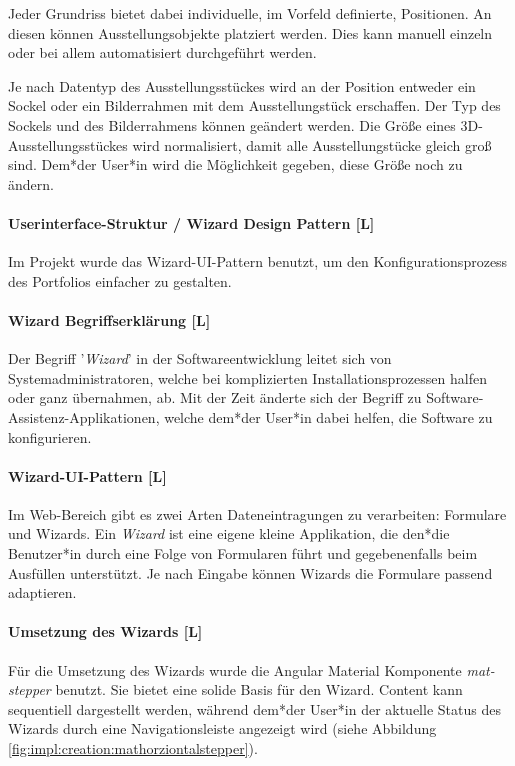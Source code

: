 Jeder Grundriss bietet dabei individuelle, im Vorfeld definierte, Positionen. An diesen können Ausstellungsobjekte
platziert werden. Dies kann manuell einzeln oder bei allem automatisiert durchgeführt werden.

Je nach Datentyp des Ausstellungsstückes wird an der Position entweder ein Sockel oder ein Bilderrahmen mit dem Ausstellungstück erschaffen. Der Typ des Sockels und des Bilderrahmens können geändert werden.
Die Größe eines 3D-Ausstellungsstückes wird normalisiert, damit alle Ausstellungstücke gleich groß sind. Dem*der User*in wird die Möglichkeit gegeben, diese Größe noch zu ändern.

\paragraph{Userinterface-Struktur / Wizard Design Pattern [L]}
\label{sec::contentcreation::wizard}
Im Projekt wurde das Wizard-UI-Pattern benutzt, um den Konfigurationsprozess des Portfolios einfacher zu gestalten.

\paragraph*{Wizard Begriffserklärung [L]}
Der Begriff '\emph{Wizard}' in der Softwareentwicklung leitet sich von Systemadministratoren, welche bei komplizierten Installationsprozessen halfen oder ganz übernahmen, ab. Mit der Zeit änderte sich der Begriff zu Software-Assistenz-Applikationen, welche dem*der User*in dabei helfen, die Software zu konfigurieren. \cite[Ursprung des Begriffs Wizard]{OrigionOfWizards}

\paragraph{Wizard-UI-Pattern [L]}
Im Web-Bereich gibt es zwei Arten Dateneintragungen zu verarbeiten: Formulare und Wizards. 
Ein \emph{Wizard} ist eine eigene kleine Applikation, die den*die Benutzer*in durch eine Folge von Formularen führt und gegebenenfalls beim Ausfüllen unterstützt. Je nach Eingabe können Wizards die Formulare passend adaptieren.\cite[Wizards: Definition and Design Recommendations]{WizradsDefinitionAndRecommandation}

\paragraph{Umsetzung des Wizards [L]}
Für die Umsetzung des Wizards wurde die Angular Material Komponente \emph{mat-stepper} benutzt. Sie bietet eine solide Basis für den Wizard. Content kann sequentiell dargestellt werden, während dem*der User*in der aktuelle Status des Wizards durch eine Navigationsleiste angezeigt wird (siehe Abbildung \ref{fig:impl:creation:mathorziontalstepper}). \cite{amStepper}

